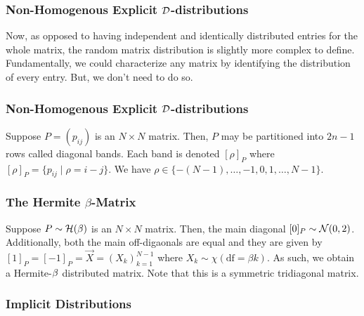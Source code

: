 \begin{frame} \frametitle{Non-Homogenous Explicit $\mathcal{D}$-distributions}

Now, as opposed to having independent and identically distributed entries for the whole matrix, the random matrix distribution is slightly more complex to define.
Fundamentally, we could characterize any matrix by identifying the distribution of every entry. But, we don't need to do so.

\end{frame}
\begin{frame} \frametitle{Non-Homogenous Explicit $\mathcal{D}$-distributions}

  \begin{alertblock}{}
    Suppose $P = (p_{ij})$ is an $N \times N$ matrix. Then, $P$ may be partitioned into $2n - 1$ rows called diagonal bands. Each band is denoted $[\rho]_P$ where $[\rho]_P = \{p_{ij} \mid \rho = i - j\}$. We have
    $\rho \in \{ -(N-1), \dots, -1, 0, 1, \dots, N-1 \}$.
  \end{alertblock}

\end{frame}
\begin{frame} \frametitle{The Hermite $\beta$-Matrix}

  \begin{alertblock}{}
    Suppose $P \sim \mathcal{H}(\beta)$ is an $N \times N$ matrix. Then, the main diagonal $[0]_P \sim \mathcal{N}(0,2)$.
    Additionally, both the main off-digaonals are equal and they are given by $[1]_{P} = [-1]_{P} = \vec{X} = (X_k)_{k=1}^{N-1}$ where $X_k \sim \chi(\text{df} = \beta k)$.
    As such, we obtain a Hermite-$\beta$ distributed matrix. Note that this is a symmetric tridiagonal matrix.
  \end{alertblock}

\end{frame}
\begin{frame} \frametitle{Implicit Distributions}



\end{frame}


